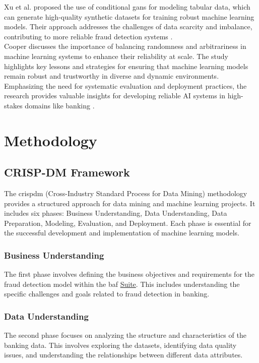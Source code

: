 \documentclass[12pt,a4paper]{report}
\begin{document}
Xu et al. proposed the use of conditional \acrshort{gan}s for modeling tabular data, which can generate high-quality synthetic datasets for training robust machine learning models. Their approach addresses the challenges of data scarcity and imbalance, contributing to more reliable fraud detection systems \citep[p.42]{xu2019modeling}.\\

Cooper discusses the importance of balancing randomness and arbitrariness in machine learning systems to enhance their reliability at scale. The study highlights key lessons and strategies for ensuring that machine learning models remain robust and trustworthy in diverse and dynamic environments. Emphasizing the need for systematic evaluation and deployment practices, the research provides valuable insights for developing reliable AI systems in high-stakes domains like banking \citep{cooper2024between}.










\chapter{Methodology}

\section{CRISP-DM Framework}
The \acrshort{crispdm} (Cross-Industry Standard Process for Data Mining) methodology provides a structured approach for data mining and machine learning projects. It includes six phases: Business Understanding, Data Understanding, Data Preparation, Modeling, Evaluation, and Deployment. Each phase is essential for the successful development and implementation of machine learning models.

\subsection{Business Understanding}
The first phase involves defining the business objectives and requirements for the fraud detection model within the \acrshort{baf} \href{https://www.kaggle.com/datasets/sgpjesus/bank-account-fraud-dataset-neurips-2022/code}{Suite}. This includes understanding the specific challenges and goals related to fraud detection in banking.

\subsection{Data Understanding}
The second phase focuses on analyzing the structure and characteristics of the banking data. This involves exploring the datasets, identifying data quality issues, and understanding the relationships between different data attributes.\\
\end{document}
